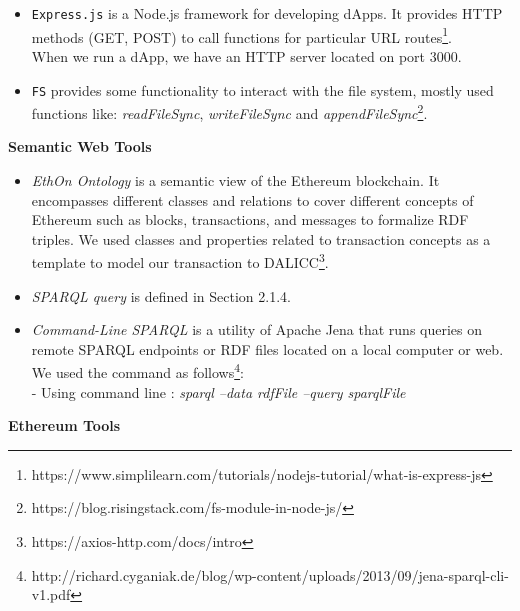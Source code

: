 \begin{itemize}
HDWalletProvider provides a custom URL: 'http://127.0.0.1:7545'. This will spawn a development blockchain locally on port 7545\footnote{https://github.com/trufflesuite/truffle-hdwallet-provider}. \\
\item \texttt{Express.js} is a Node.js framework for developing dApps. It provides HTTP methods (GET, POST) to call functions for particular URL routes\footnote{https://www.simplilearn.com/tutorials/nodejs-tutorial/what-is-express-js}. \\ 
When we run a dApp, we have an HTTP server located on port 3000. \\
\item \texttt{FS} provides some functionality to interact with the file system, mostly used functions like: \textit{readFileSync}, \textit{writeFileSync} and \textit{appendFileSync}\footnote{https://blog.risingstack.com/fs-module-in-node-js/}. \\
\end{itemize}

\textbf{Semantic Web Tools}\\
\begin{itemize}
	\item \textit{EthOn Ontology} is a semantic view of the Ethereum blockchain. It encompasses different classes and relations to cover different concepts of Ethereum such as blocks, transactions, and messages to formalize RDF triples. We used classes and properties related to transaction concepts as a template to model our transaction to DALICC\footnote{https://axios-http.com/docs/intro}.
	\item \textit{SPARQL query} is defined in Section 2.1.4.
	\item \textit{Command-Line SPARQL} is a utility of Apache Jena that runs queries on remote SPARQL endpoints or RDF files located on a local computer or web. We used the command as follows\footnote{http://richard.cyganiak.de/blog/wp-content/uploads/2013/09/jena-sparql-cli-v1.pdf}:\\
	 - Using command line : \textit{sparql --data rdfFile --query sparqlFile}
\end{itemize}
\textbf{Ethereum Tools}


